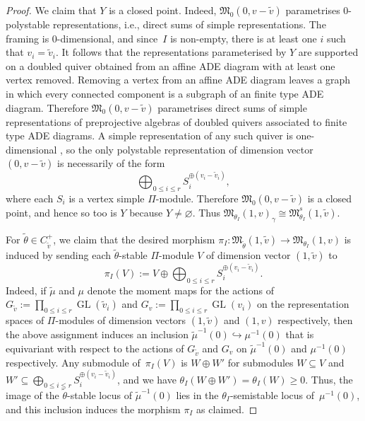 \documentclass[pdftex]{sigma}%
\newcommand{\GL}{\operatorname{GL}}
\numberwithin{equation}{section}
\begin{document}
\begin{proof}
 We claim that ${Y}$ is a closed point. Indeed, $\mathfrak{M}_0(0, v-\widetilde{v})$ parametrises
 0-polystable representations, i.e., direct sums of simple representations. The framing is 0-dimensional,
and since~$I$ is non-empty, there is at least one $i$ such that $v_i = \widetilde{v}_i$. It follows that the representations parameterised by ${Y}$
are supported on a doubled quiver obtained from an affine ADE diagram with at least one vertex removed. Removing a vertex from an affine ADE diagram leaves a graph in which every connected component is a subgraph of an finite type ADE diagram. Therefore $\mathfrak{M}_0(0, v-\widetilde{v})$ parametrises direct sums of simple representations of preprojective algebras of doubled quivers associated to finite type ADE diagrams. A simple representation of any such quiver is one-dimensional \cite[Lemma~2.2]{savage2011quiver}, so the only polystable representation of dimension vector $(0, v-\widetilde{v})$ is
necessarily of the form
\begin{equation}\label{eqn:directsumsimples}
\bigoplus_{0\leq i\leq r}S_i^{\oplus(v_i-\tilde{v}_i)},
\end{equation}
where each $S_i$ is a vertex simple $\Pi$-module. Therefore $\mathfrak{M}_0(0, v-\widetilde{v})$ is a closed point, and hence so too is ${Y}$ because ${Y}\neq \varnothing$. Thus $\mathfrak{M}_{\theta_I}(1,v)_{\gamma} \cong \mathfrak{M}^s_{\theta_I}(1,\widetilde{v})$.

For
 $\widetilde\theta\in C_{\widetilde v}^+$, we claim that the desired morphism $\pi_I\colon \mathfrak{M}_{\widetilde{\theta}}(1,\widetilde{v})\to \mathfrak{M}_{\theta_I}(1,v)$ is induced by sending each $\tilde{\theta}$-stable $\Pi$-module $V$ of dimension vector $(1,\tilde{v})$ to
 \[
 \pi_I(V):=V\oplus\bigoplus_{0\leq i\leq r}S_i^{\oplus(v_i-\tilde{v}_i)}.
 \]
 Indeed, if $\tilde{\mu}$ and $\mu$ denote the moment maps for the actions of $G_{\tilde{v}}:=\prod_{0\leq i\leq r}\GL(\tilde{v}_i)$ and $G_{v}:=\prod_{0\leq i\leq r}\GL(v_i)$ on the representation spaces of $\Pi$-modules of dimension vectors $(1,\tilde{v})$ and $(1,v)$ respectively, then the above assignment induces an inclusion $\tilde{\mu}^{-1}(0)\hookrightarrow \mu^{-1}(0)$ that is equivariant with respect to the actions of $G_{\tilde{v}}$ and $G_v$ on $\tilde{\mu}^{-1}(0)$ and $\mu^{-1}(0)$ respectively. Any submodule of~$\pi_I(V)$ is $W\oplus W'$ for submodules $W\subseteq V$ and $W'\subseteq \bigoplus_{0\leq i\leq r}S_i^{\oplus(v_i-\tilde{v}_i)}$, and we have $\theta_I(W\oplus W') = \theta_I(W)\geq 0$. Thus, the image of the $\tilde{\theta}$-stable locus of $\tilde{\mu}^{-1}(0)$ lies in the $\theta_I$-semistable locus of~$\mu^{-1}(0)$, and this inclusion induces the morphism $\pi_I$ as claimed.


\end{proof}
\end{document}
